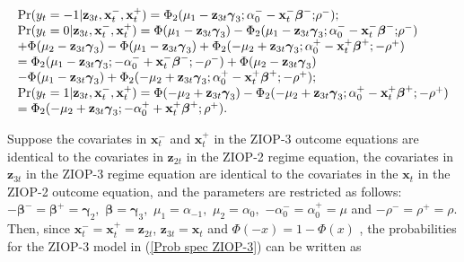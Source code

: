 \documentclass[letterpaper,fleqn,12pt]{article}
\begin{document}
\begin{flushleft}
\begin{equation}
\begin{array}{l}
\Pr (y_{t}=-1|\mathbf{z}_{3t},\mathbf{x}_{t}^{-},\mathbf{x}_{t}^{+})=\Phi
_{2}(\mu _{1}-\mathbf{z}_{3t}\mathbf{\gamma }_{3};\alpha _{0}^{-}-\mathbf{x}%
_{t}^{-}\mathbf{\beta }^{-}\mathbf{;}\rho ^{-}); \\ 
\Pr (y_{t}=0|\mathbf{z}_{3t},\mathbf{x}_{t}^{-},\mathbf{x}_{t}^{+})=\Phi
(\mu _{1}-\mathbf{z}_{3t}\mathbf{\gamma }_{3})-\Phi _{2}(\mu _{1}-\mathbf{z}%
_{3t}\mathbf{\gamma }_{3};\alpha _{0}^{-}-\mathbf{x}_{t}^{-}\mathbf{\beta }%
^{-}\mathbf{;}\rho ^{-}) \\ 
+\Phi (\mu _{2}-\mathbf{z}_{3t}\mathbf{\gamma }_{3})-\Phi (\mu _{1}-\mathbf{z%
}_{3t}\mathbf{\gamma }_{3})+\Phi _{2}(-\mu _{2}+\mathbf{z}_{3t}\mathbf{%
\gamma }_{3};\alpha _{0}^{+}-\mathbf{x}_{t}^{+}\mathbf{\beta }^{+};\mathbf{-}%
\rho ^{+}) \\ 
=\Phi _{2}(\mu _{1}-\mathbf{z}_{3t}\mathbf{\gamma }_{3};-\alpha _{0}^{-}+%
\mathbf{x}_{t}^{-}\mathbf{\beta }^{-}\mathbf{;-}\rho ^{-})+\Phi (\mu _{2}-%
\mathbf{z}_{3t}\mathbf{\gamma }_{3}) \\ 
-\Phi (\mu _{1}-\mathbf{z}_{3t}\mathbf{\gamma }_{3})+\Phi _{2}(-\mu _{2}+%
\mathbf{z}_{3t}\mathbf{\gamma }_{3};\alpha _{0}^{+}-\mathbf{x}_{t}^{+}%
\mathbf{\beta }^{+};\mathbf{-}\rho ^{+}); \\ 
\Pr (y_{t}=1|\mathbf{z}_{3t},\mathbf{x}_{t}^{-},\mathbf{x}_{t}^{+})=\Phi
(-\mu _{2}+\mathbf{z}_{3t}\mathbf{\gamma }_{3})-\Phi _{2}(-\mu _{2}+\mathbf{z%
}_{3t}\mathbf{\gamma }_{3};\alpha _{0}^{+}-\mathbf{x}_{t}^{+}\mathbf{\beta }%
^{+};\mathbf{-}\rho ^{+}) \\ 
=\Phi _{2}(-\mu _{2}+\mathbf{z}_{3t}\mathbf{\gamma }_{3};-\alpha _{0}^{+}+%
\mathbf{x}_{t}^{+}\mathbf{\beta }^{+};\rho ^{+}).%
\end{array}
\label{Prob spec ZIOP-3}
\end{equation}
\end{flushleft}

Suppose the covariates in $\mathbf{x}_{t}^{-}$ and $\mathbf{x}_{t}^{+}$ in
the ZIOP-3 outcome equations are identical to the covariates in $\mathbf{z}%
_{2t}$ in the ZIOP-2 regime equation, the covariates in $\mathbf{z}_{3t}$ in
the ZIOP-3 regime equation are identical to the covariates in the $\mathbf{x}%
_{t}$ in the ZIOP-2 outcome equation, and the parameters are restricted as
follows: $-\mathbf{\beta }^{-}=\mathbf{\beta }^{+}=\mathbf{\gamma }_{2},$ $%
\mathbf{\beta }=\mathbf{\gamma }_{3},$ $\mu _{1}=\alpha _{-1},$ $\mu
_{2}=\alpha _{0},$ $-\alpha _{0}^{-}=\alpha _{0}^{+}=\mu $ and $-\rho
^{-}=\rho ^{+}=\rho $. Then, since $\mathbf{x}_{t}^{-}=\mathbf{x}_{t}^{+}=%
\mathbf{z}_{2t}$, $\mathbf{z}_{3t}=\mathbf{x}_{t}$ and $\Phi (-x)=1-\Phi (x)$%
, the probabilities for the ZIOP-3 model in (\ref{Prob spec ZIOP-3}) can be
written as
\end{document}
